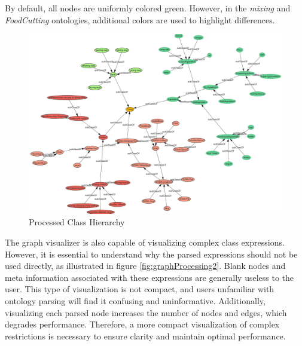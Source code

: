 By default, all nodes are uniformly colored green. However, in the \textit{mixing} and \textit{FoodCutting} ontologies, 
additional colors are used to highlight differences.
\begin{figure}[H]
    \includegraphics[scale=0.5]{Graphics/OwlVisualizer/graphProcessing1.png}
    \centering
    \caption{Processed Class Hierarchy}
\end{figure}

The graph visualizer is also capable of visualizing complex class expressions. 
However, it is essential to understand why the parsed expressions should not be used directly, as illustrated in figure \ref{fig:graphProcessing2}. 
Blank nodes and meta information associated with these expressions are generally useless to the user. 
This type of visualization is not compact, and users unfamiliar with ontology parsing will find it confusing and uninformative. 
Additionally, visualizing each parsed node increases the number of nodes and edges, which degrades performance. 
Therefore, a more compact visualization of complex restrictions is necessary to ensure clarity and maintain optimal performance.

